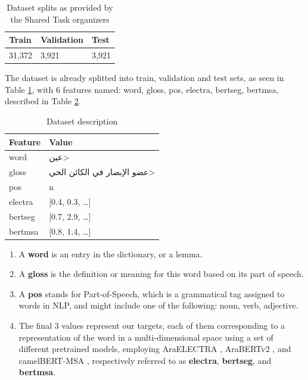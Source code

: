 \documentclass[12.5pt]{article}
\begin{document}
\begin{table}[H]
    \centering
    \caption{Dataset splits as provided by the Shared Task organizers}
    \label{table:dataset-splits}
    \renewcommand{\arraystretch}{1.5}%
    \begin{tabularx}{\textwidth}{|X|X|X|}
        \hline
        \textbf{Train} & \textbf{Validation} & \textbf{Test} \\
        \hline
        31,372 & 3,921 & 3,921 \\
        \hline
    \end{tabularx}
\end{table}

The dataset is already splitted into train, validation and test sets, as seen in Table \ref{table:dataset-splits}, with 6 features named: word, gloss, pos, electra, bertseg, bertmsa, described in Table \ref{table:dataset-desc}.

\begin{table}[H]
    \centering
    \caption{Dataset description}
    \label{table:dataset-desc}
    \renewcommand{\arraystretch}{1.5}%
    \begin{tabularx}{\textwidth}{|l|X|}
        \hline
        \textbf{Feature} & \textbf{Value} \\
        \hline
        word & \<عين> \\
        \hline
        gloss & \<عضو الإبصار في الكائن الحي> \\
        \hline
        pos & n \\
        \hline
        electra & [0.4, 0.3, …] \\
        \hline
        bertseg & [0.7, 2.9, …] \\
        \hline
        bertmsa & [0.8, 1.4, …] \\
        \hline
    \end{tabularx}
\end{table}

\begin{enumerate}
    \item A \textbf{word} is an entry in the dictionary, or a lemma.
    \item A \textbf{gloss} is the definition or meaning for this word based on its part of speech.
    \item A \textbf{pos} stands for Part-of-Speech, which is a grammatical tag assigned to words in NLP, and might include one of the following: noun, verb, adjective.
    \item The final 3 values represent our targets, each of them corresponding to a representation of the word in a multi-dimensional space using a set of different pretrained models, employing AraELECTRA \cite{Antoun2020-araELECTRA}, AraBERTv2 \cite{Antoun2020-araBERT}, and camelBERT-MSA \cite{inoue2021}, respectively referred to as \textbf{electra}, \textbf{bertseg}, and \textbf{bertmsa}.
\end{enumerate}
\end{document}
